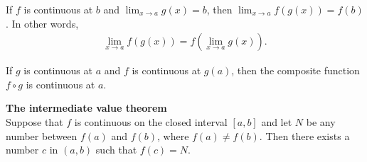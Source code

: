 \documentclass{article}
\begin{document}
\begin{theorem}
    If $f$ is continuous at $b$ and $\lim_{x\to a}g(x) = b$, then $\lim_{x\to a}f(g(x))=f(b)$. In other words,
    \begin{align*}
        \lim_{x\to a}f(g(x))=f\left(\lim_{x\to a}g(x)\right).
    \end{align*}
\end{theorem}
\begin{theorem}
    If $g$ is continuous at $a$ and $f$ is continuous at $g(a)$, then the composite function $f\circ g$ is continuous at $a$.
\end{theorem}
\begin{theorem}
    \textbf{The intermediate value theorem}\\
    Suppose that $f$ is continuous on the closed interval $[a,b]$ and let $N$ be any number between $f(a)$ and $f(b)$, where $f(a)\not=f(b)$. Then there exists a number $c$ in $(a,b)$ such that $f(c)=N$.
\end{theorem}
\end{document}
